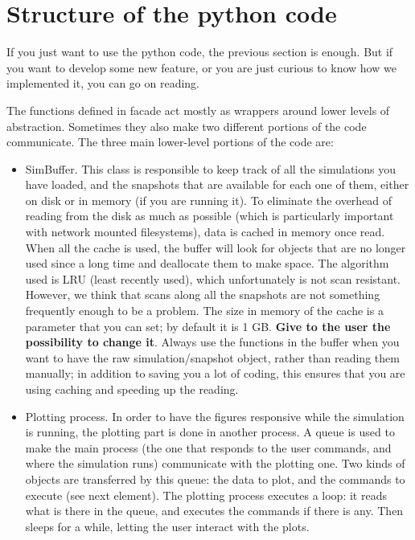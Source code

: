 \documentclass[a4paper]{article}
\begin{document}

\section{Structure of the python code}

If you just want to use the python code, the previous section is enough. But if you want to develop some new feature, or you are just curious to know how we implemented it, you can go on reading.

The functions defined in facade act mostly as wrappers around lower levels of abstraction. Sometimes they also make two different portions of the code communicate. The three main lower-level portions of the code are:
\begin{itemize}

\item SimBuffer. This class is responsible to keep track of all the simulations you have loaded, and the snapshots that are available for each one of them, either on disk or in memory (if you are running it). To eliminate the overhead of reading from the disk as much as possible (which is particularly important with network mounted filesystems), data is cached in memory once read. When all the cache is used, the buffer will look for objects that are no longer used since a long time and deallocate them to make space. The algorithm used is LRU (least recently used), which unfortunately is not scan resistant. However, we think that scans along all the snapshots are not something frequently enough to be a problem. The size in memory of the cache is a parameter that you can set; by default it is 1 GB. \textbf{Give to the user the possibility to change it}. Always use the functions in the buffer when you want to have the raw simulation/snapshot object, rather than reading them manually; in addition to saving you a lot of coding, this ensures that you are using caching and speeding up the reading.

\item Plotting process. In order to have the figures responsive while the simulation is running, the plotting part is done in another process. A queue is used to make the main process (the one that responds to the user commands, and where the simulation runs) communicate with the plotting one. Two kinds of objects are transferred by this queue: the data to plot, and the commands to execute (see next element). The plotting process executes a loop: it reads what is there in the queue, and executes the commands if there is any. Then sleeps for a while, letting the user interact with the plots.


\end{itemize}
\end{document}
